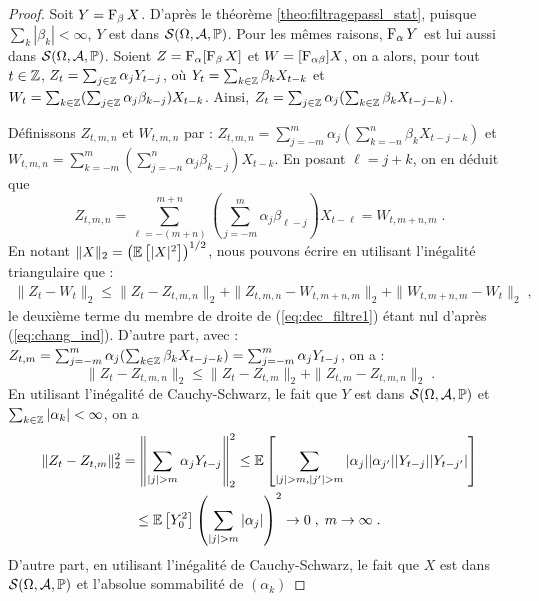 \begin{proof}
 Soit $Y=\operatorname{F}_{\beta}X$. D'apr\`es le th\'eor\`eme \ref{theo:filtragepassl_stat},
puisque $\sum_k|\beta_k|<\infty$, $Y$ est dans $\mathcal{S}(\Omega,\mathcal{A},\mathbb{P})$.
Pour les m\^{e}mes raisons, $\operatorname{F}_{\alpha}Y$ est lui aussi dans $\mathcal{S}(\Omega,\mathcal{A},\mathbb{P})$.
Soient $Z=\operatorname{F}_{\alpha}[\operatorname{F}_{\beta}X]$ et $W=[\operatorname{F}_{\alpha\beta}]X$, on a alors, pour tout $t\in\mathbb{Z}$,
$Z_t=\sum_{j\in\mathbb{Z}}\alpha_j Y_{t-j}$,
o\`u $Y_t=\sum_{k\in\mathbb{Z}}\beta_k X_{t-k}$ et $W_t=\sum_{k\in\mathbb{Z}}(\sum_{j\in\mathbb{Z}}\alpha_j\beta_{k-j})X_{t-k}$. Ainsi,
$Z_t=\sum_{j\in\mathbb{Z}}\alpha_j(\sum_{k\in\mathbb{Z}}\beta_k X_{t-j-k})$.

D\'efinissons $Z_{t,m,n}$ et $W_{t,m,n}$ par :
$Z_{t,m,n}=\sum_{j=-m}^m\alpha_j(\sum_{k=-n}^n\beta_k X_{t-j-k})$
et $W_{t,m,n}=\sum_{k=-m}^m(\sum_{j=-n}^n\alpha_j\beta_{k-j})X_{t-k}$.
En posant $\ell=j+k$, on en d\'eduit que
\begin{equation}\label{eq:chang_ind}
Z_{t,m,n}=\sum_{\ell=-(m+n)}^{m+n}(\sum_{j=-m}^m\alpha_j\beta_{\ell-j})X_{t-\ell}
=W_{t,m+n,m}\;.
\end{equation}
En notant $\| X \|_2 = \left( {\mathbb E}\left[ |X|^2 \right] \right)^{1/2}$, nous pouvons
\'ecrire en utilisant l'in\'egalit\'e triangulaire que :
\begin{multline}\label{eq:dec_filtre1}
\|Z_t-W_t\|_2\leq \|Z_t-Z_{t,m,n}\|_2+\|Z_{t,m,n}-W_{t,m+n,m}\|_2
+\|W_{t,m+n,m}-W_t\|_2\;,
\end{multline}
le deuxi\`eme terme du membre de droite de (\ref{eq:dec_filtre1}) \'etant
nul d'apr\`es (\ref{eq:chang_ind}).
D'autre part, avec :
$Z_{t,m}=\sum_{j=-m}^m\alpha_j(\sum_{k\in\mathbb{Z}}\beta_k X_{t-j-k})
=\sum_{j=-m}^m\alpha_j Y_{t-j}$, on a :
\begin{equation}\label{eq:dec_filtre2}
\|Z_t-Z_{t,m,n}\|_2\leq\|Z_t-Z_{t,m}\|_2+\|Z_{t,m}-Z_{t,m,n}\|_2\;.
\end{equation}
En utilisant l'in\'egalit\'e de Cauchy-Schwarz, le fait que
$Y$ est dans $\mathcal{S}(\Omega,\mathcal{A},\mathbb{P})$ et $\sum_{k\in\mathbb{Z}}|\alpha_k|<\infty$,  on a
\begin{multline}\label{eq:dec_filtre3}
\|Z_t-Z_{t,m}\|_2^2=\left\|\sum_{|j|>m}\alpha_j Y_{t-j}\right\|_2^2
\leq\PE{\sum_{|j|>m,|j'|>m}|\alpha_j| |\alpha_{j'}| |Y_{t-j}| |Y_{t-j'}|}\\
\leq \PE{Y_0^2}\left(\sum_{|j|>m} |\alpha_j|\right)^2\to 0\;,\; m\to\infty\;.
\end{multline}
D'autre part, en utilisant l'in\'egalit\'e de Cauchy-Schwarz, le fait que
$X$ est dans $\mathcal{S}(\Omega,\mathcal{A},\mathbb{P})$ et l'absolue sommabilit\'e de $(\alpha_k)$

\end{proof}
